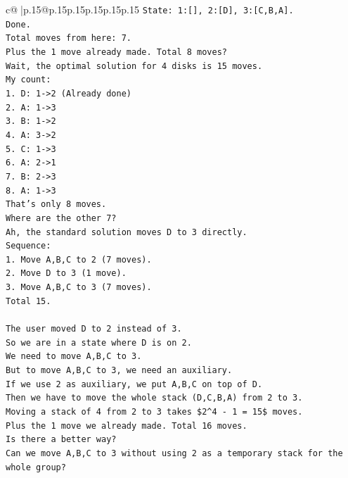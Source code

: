 \documentclass{article}
\begin{document}
{\begin{supertabular}{c@{$\;$}|p{.15\linewidth}@{}p{.15\linewidth}p{.15\linewidth}p{.15\linewidth}p{.15\linewidth}p{.15\linewidth}}
{{{\texttt{State: 1:{[}{]}, 2:{[}D{]}, 3:{[}C,B,A{]}.} \\
\texttt{Done.} \\
\texttt{Total moves from here: 7.} \\
\texttt{Plus the 1 move already made. Total 8 moves?} \\
\texttt{Wait, the optimal solution for 4 disks is 15 moves.} \\
\texttt{My count:} \\
\texttt{1. D: 1{-}>2 (Already done)} \\
\texttt{2. A: 1{-}>3} \\
\texttt{3. B: 1{-}>2} \\
\texttt{4. A: 3{-}>2} \\
\texttt{5. C: 1{-}>3} \\
\texttt{6. A: 2{-}>1} \\
\texttt{7. B: 2{-}>3} \\
\texttt{8. A: 1{-}>3} \\
\texttt{That's only 8 moves.} \\
\texttt{Where are the other 7?} \\
\texttt{Ah, the standard solution moves D to 3 directly.} \\
\texttt{Sequence:} \\
\texttt{1. Move A,B,C to 2 (7 moves).} \\
\texttt{2. Move D to 3 (1 move).} \\
\texttt{3. Move A,B,C to 3 (7 moves).} \\
\texttt{Total 15.} \\
\\ 
\texttt{The user moved D to 2 instead of 3.} \\
\texttt{So we are in a state where D is on 2.} \\
\texttt{We need to move A,B,C to 3.} \\
\texttt{But to move A,B,C to 3, we need an auxiliary.} \\
\texttt{If we use 2 as auxiliary, we put A,B,C on top of D.} \\
\texttt{Then we have to move the whole stack (D,C,B,A) from 2 to 3.} \\
\texttt{Moving a stack of 4 from 2 to 3 takes \$2\^{}4 {-} 1 = 15\$ moves.} \\
\texttt{Plus the 1 move we already made. Total 16 moves.} \\
\texttt{Is there a better way?} \\
\texttt{Can we move A,B,C to 3 without using 2 as a temporary stack for the whole group?} \\
}}}
\end{supertabular}}
\end{document}
